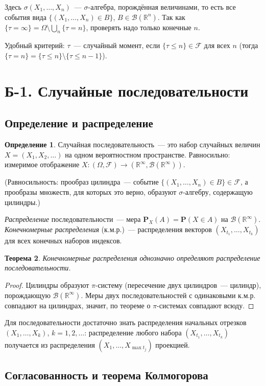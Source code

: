 \documentclass[11pt,a4paper]{article}
\newtheorem{thm}{Теорема}[section]
\theoremstyle{definition}
\newtheorem{defn}[thm]{Определение}
\newcommand{\PP}{\mathbf P}
\newcommand{\R}{\mathbb R}
\newcommand{\B}{\mathcal B}
\newcommand{\F}{\mathcal F}
\newcommand{\1}{\mathbf 1}
\begin{document}
Здесь $\sigma(X_1,\dots,X_n)$~--- $\sigma$-алгебра, порождённая величинами,
то есть все события вида $\{(X_1,\dots,X_n)\in B\}$, $B\in\B(\R^n)$.
Так как $\{\tau=\infty\}=\Omega\setminus\bigcup_n\{\tau=n\}$, проверять надо
только конечные $n$.

Удобный критерий: $\tau$~--- случайный момент, если $\{\tau\le n\}\in\F$ для
всех $n$ (тогда $\{\tau=n\}=\{\tau\le n\}\setminus\{\tau\le n-1\}$).

\section{Б-1. Случайные последовательности}

\subsection{Определение и распределение}

\begin{defn}
Случайная последовательность~--- это набор случайных величин
$X=(X_1,X_2,\dots)$ на одном вероятностном пространстве. Равносильно: измеримое
отображение $X:(\Omega,\F)\to(\R^\infty,\B(\R^\infty))$.
\end{defn}
(Равносильность: прообраз цилиндра~--- событие
$\{(X_1,\dots,X_n)\in B\}\in\F$, а прообразы множеств, для которых это верно,
образуют $\sigma$-алгебру, содержащую цилиндры.)

\emph{Распределение} последовательности~--- мера
$\PP_X(A)=\PP(X\in A)$ на $\B(\R^\infty)$.
\emph{Конечномерные распределения} (к.м.р.)~--- распределения векторов
$(X_{t_1},\dots,X_{t_k})$ для всех конечных наборов индексов.

\begin{thm}
Конечномерные распределения однозначно определяют распределение
последовательности.
\end{thm}
\begin{proof}
Цилиндры образуют $\pi$-систему (пересечение двух цилиндров~--- цилиндр),
порождающую $\B(\R^\infty)$. Меры двух последовательностей с одинаковыми
к.м.р. совпадают на цилиндрах, значит, по теореме о $\pi$-системах совпадают
всюду.
\end{proof}
Для последовательности достаточно знать распределения начальных отрезков
$(X_1,\dots,X_k)$, $k=1,2,\dots$: распределение любого набора
$(X_{t_1},\dots,X_{t_k})$ получается из распределения $(X_1,\dots,X_{\max t_j})$
проекцией.

\subsection{Согласованность и теорема Колмогорова}
\end{document}
